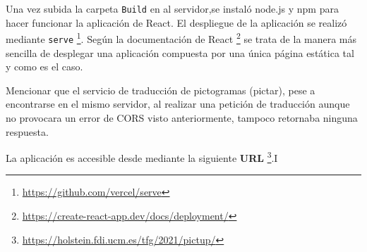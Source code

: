 Una vez subida la carpeta \texttt{Build} en al servidor,se instaló \texttt{}node.js y npm para hacer funcionar la aplicación de React. El despliegue de la aplicación se realizó mediante \texttt{serve} \footnote{\url{https://github.com/vercel/serve}}. Según la documentación de React \footnote{\url{https://create-react-app.dev/docs/deployment/}} se trata de la manera más sencilla de desplegar una aplicación compuesta por una única página estática tal y como es el caso. 

Mencionar que el servicio de traducción de pictogramas (pictar), pese a encontrarse en el mismo servidor, al realizar una petición de traducción aunque no provocara un error de CORS visto anteriormente, tampoco retornaba ninguna respuesta. 

La aplicación es accesible desde mediante la siguiente \textbf{URL} \footnote{\url{https://holstein.fdi.ucm.es/tfg/2021/pictup/}}.I









